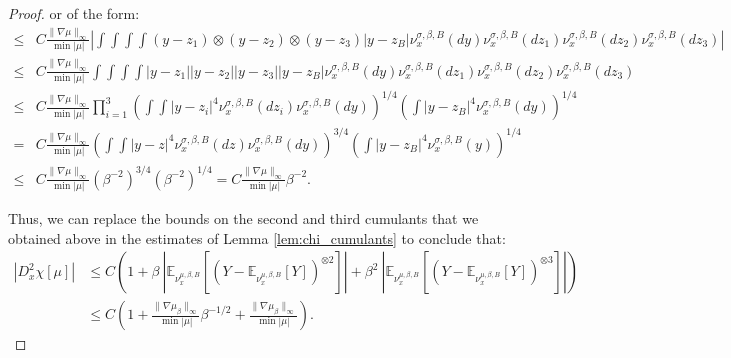 \documentclass{article}
\numberwithin{theorem}{section}
\begin{document}
\begin{proof}
or of the form:
\begin{align*}
\leq&C\frac{\|\nabla \mu\|_\infty}{\min |\mu|}\left|\int\int\int\int (y-z_1)\otimes(y-z_2)\otimes(y-z_3) |y-z_B| \nu_x^{\sigma, \beta, B}(dy) \nu_x^{\sigma, \beta, B}(dz_1) \nu_x^{\sigma, \beta, B}(dz_2) \nu_x^{\sigma, \beta, B}(dz_3)\right|\\
\leq&C \frac{\|\nabla \mu\|_\infty}{\min |\mu|}\int\int\int\int |y-z_1||y-z_2||y-z_3||y-z_B| \nu_x^{\sigma, \beta, B}(dy)  \nu_x^{\sigma, \beta, B}(dz_1) \nu_x^{\sigma, \beta, B}(dz_2) \nu_x^{\sigma, \beta, B}(dz_3)\\
\leq&C\frac{\|\nabla \mu\|_\infty}{\min |\mu|} \prod_{i=1}^3\left(\int\int|y-z_i|^4\nu_x^{\sigma, \beta, B}(dz_i) \nu_x^{\sigma, \beta, B}(dy) \right)^{1/4} \left(\int |y-z_B|^4 \nu_x^{\sigma, \beta, B}(dy)\right)^{1/4}\\
=&C\frac{\|\nabla \mu\|_\infty}{\min |\mu|}\left(\int \int|y-z|^4\nu_x^{\sigma, \beta, B}(dz) \nu_x^{\sigma, \beta, B}(dy)\right)^{3/4} \left( \int |y-z_B|^4 \nu_x^{\sigma, \beta, B}(y)\right)^{1/4}\\
\leq&C\frac{\|\nabla \mu\|_\infty}{\min |\mu|} (\beta^{-2})^{3/4} (\beta^{-2})^{1/4}=C\frac{\|\nabla \mu\|_\infty}{\min |\mu|} \beta^{-2}.
\end{align*} 

Thus, we can replace the bounds on the second and third cumulants that we obtained above in the estimates of Lemma \ref{lem:chi_cumulants} to conclude that:
\begin{align*}
|D^2_x\chi[\mu]|&\leq C\left(1+ \beta\ | \mathbb{E}_{\nu_{x}^{\mu,\beta,B}}[\left(Y-\mathbb{E}_{\nu_{x}^{\mu,\beta,B}}[Y]\right)^{\otimes 2}]|+\beta^2 \ | \mathbb{E}_{\nu_{x}^{\mu,\beta,B}}[\left(Y-\mathbb{E}_{\nu_{x}^{\mu,\beta,B}}[Y]\right)^{\otimes 3}]|\right)\\
&\leq C\left(1+\frac{\|\nabla \mu_\beta\|_\infty}{\min |\mu|}\beta^{-1/2}+\frac{\|\nabla \mu_\beta\|_\infty}{\min |\mu|}\right).
\end{align*}
\end{proof}
\end{document}
